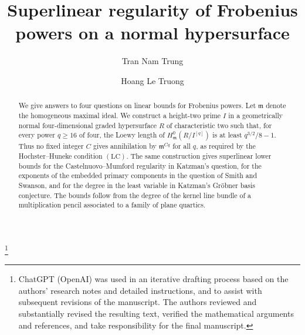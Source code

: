 \documentclass[11pt,a4paper,reqno]{amsart}
\numberwithin{equation}{section}
\theoremstyle{plain}
\theoremstyle{definition}
\theoremstyle{remark}
\begin{document}

\title{Superlinear regularity of Frobenius powers on a normal hypersurface}

\author[T.N.Trung]{Tran Nam Trung}
\address{Institute for Artificial Intelligence, VNU University of Engineering and Technology, Hanoi, Vietnam}

\author[H.L.Truong]{Hoang Le Truong}
\address{Institute for Artificial Intelligence, VNU University of Engineering and Technology, Hanoi, Vietnam}


\thanks{ChatGPT (OpenAI) was used in an iterative drafting process based on the authors' research notes and detailed instructions, and to assist with subsequent revisions of the manuscript. The authors reviewed and substantially revised the resulting text, verified the mathematical arguments and references, and take responsibility for the final manuscript.}




\begin{abstract}
We give answers to four questions on linear bounds for Frobenius powers.
Let $\mathfrak m$ denote the homogeneous maximal ideal.
We construct a height-two prime $I$ in a geometrically normal four-dimensional
graded hypersurface $R$ of characteristic two such that, for every power
$q\geq16$ of four, the Loewy length of $H^0_{\mathfrak m}(R/I^{[q]})$
is at least $q^{3/2}/8-1$. Thus no fixed integer $C$ gives annihilation
by $\mathfrak m^{Cq}$ for all $q$, as required by the Hochster--Huneke
condition $(\mathrm{LC})$. The same construction gives superlinear lower
bounds for the Castelnuovo--Mumford regularity in Katzman's question,
for the exponents of the embedded primary components in the question of
Smith and Swanson, and for the degree in the least variable in Katzman's
Gr\"obner basis conjecture. The bounds follow from the degree of the kernel
line bundle of a multiplication pencil associated to a family of plane quartics.
\end{abstract}

\maketitle
\end{document}
